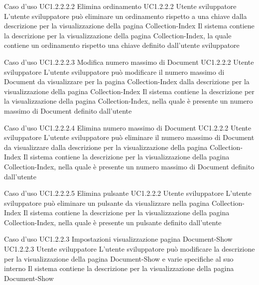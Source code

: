 \UCtitle
{Caso d'uso UC1.2.2.2.2}
{Elimina ordinamento}
\UC
{UC1.2.2.2}
{Utente sviluppatore}
{L'utente sviluppatore  può eliminare un ordinamento rispetto a una chiave dalla descrizione per la visualizzazione della pagina Collection-Index}
{Il sistema contiene la descrizione per la visualizzazione della pagina Collection-Index, la quale contiene un ordinamento rispetto una chiave definito dall'utente sviluppatore}

\UCtitle
{Caso d'uso UC1.2.2.2.3}
{Modifica numero massimo di Document}
\UC
{UC1.2.2.2}
{Utente sviluppatore}
{L'utente sviluppatore  può modificare il numero massimo di Document da visualizzare per la pagina Collection-Index dalla descrizione per la visualizzazione della pagina Collection-Index}
{Il sistema contiene la descrizione per la visualizzazione della pagina Collection-Index, nella quale è presente un numero massimo di Document definito dall'utente}

\UCtitle
{Caso d'uso UC1.2.2.2.4}
{Elimina numero massimo di Document}
\UC
{UC1.2.2.2}
{Utente sviluppatore}
{L'utente sviluppatore  può eliminare il numero massimo di Document da visualizzare dalla descrizione per la visualizzazione della pagina Collection-Index}
{Il sistema contiene la descrizione per la visualizzazione della pagina Collection-Index, nella quale è presente un numero massimo di Document definito dall'utente}

\UCtitle
{Caso d'uso UC1.2.2.2.5}
{Elimina pulsante}
\UC
{UC1.2.2.2}
{Utente sviluppatore}
{L'utente sviluppatore  può eliminare un pulsante da visualizzare nella pagina Collection-Index}
{Il sistema contiene la descrizione per la visualizzazione della pagina Collection-Index, nella quale è presente un pulsante definito dall'utente}


\UCtitle
{Caso d'uso UC1.2.2.3}
{Impostazioni visualizzazione pagina Document-Show}
\UC
{UC1.2.2.3}
{Utente sviluppatore}
{L'utente sviluppatore  può modificare la descrizione per la visualizzazione della pagina Document-Show e varie specifiche al suo interno}
{Il sistema contiene la descrizione per la visualizzazione della pagina Document-Show}


